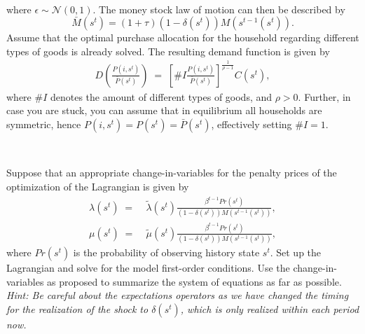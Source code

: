 \documentclass[a4paper, 12pt]{article}
\begin{document}
\begin{small}
\begin{align*}
	\end{align*}%
	where $\epsilon \sim \mathcal{N}(0,1)$. The money stock law of motion can then be described by $$\bar{M}(s^t) = (1+\tau)(1-\delta(s^t)) M(s^{t-1}(s^t)).$$%
	Assume that the optimal purchase allocation for the household regarding different types of goods is already solved. The resulting demand function is given by%
	\begin{align*}%
		D \left(\frac{P(i,s^t)}{\bar{P}(s^t)}\right) \; = \; \left[ \# I \frac{P(i,s^t)}{\bar{P}(s^t)} \right]^{\frac{1}{\rho-1}} C(s^t),%
	\end{align*}%
	where $\#I$ denotes the amount of different types of goods, and $\rho>0$. Further, in case you are stuck, you can assume that in equilibrium all households are symmetric, hence $P(i,s^t) = P(s^t) = \bar{P}(s^t)$, effectively setting $\#I = 1$.
\end{small}\\%
\bigskip%
\begin{Exercise}[title={Deriving the pricing equation},label=ex_1]%
	Suppose that an appropriate change-in-variables for the penalty prices of the optimization of the Lagrangian is given by%
	\begin{align*}%
		\lambda(s^t) \; = & \; \tilde{\lambda}(s^t) \frac{\beta^{t-1} Pr(s^t)}{(1-\delta(s^t)) M(s^{t-1}(s^t))},\\%
		\mu(s^t) \; = & \; \tilde{\mu}(s^t) \frac{\beta^{t-1} Pr(s^t)}{(1-\delta(s^t)) M(s^{t-1}(s^t))},%
	\end{align*}%
	where $Pr(s^t)$ is the probability of observing history state $s^t$. Set up the Lagrangian and solve for the model first-order conditions. Use the change-in-variables as proposed to summarize the system of equations as far as possible. \textit{Hint: Be careful about the expectations operators as we have changed the timing for the realization of the shock to $\delta(s^t)$, which is only realized within each period now.}%
\end{Exercise}%
\bigskip%
\end{document}
